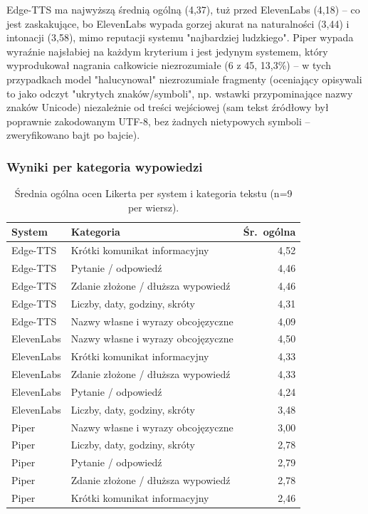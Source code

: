 \documentclass{article}
\begin{document}
Edge-TTS ma najwyższą średnią ogólną (4,37), tuż przed ElevenLabs (4,18) -- co jest
zaskakujące, bo ElevenLabs wypada gorzej akurat na naturalności (3,44) i intonacji (3,58),
mimo reputacji systemu "najbardziej ludzkiego". Piper wypada wyraźnie najsłabiej na każdym
kryterium i jest jedynym systemem, który wyprodukował nagrania całkowicie niezrozumiałe
(6 z 45, 13,3\%) -- w tych przypadkach model "halucynował" niezrozumiałe fragmenty (oceniający
opisywali to jako odczyt "ukrytych znaków/symboli", np. wstawki przypominające nazwy znaków
Unicode) niezależnie od treści wejściowej (sam tekst źródłowy był poprawnie zakodowanym
UTF-8, bez żadnych nietypowych symboli -- zweryfikowano bajt po bajcie).

\subsubsection{Wyniki per kategoria wypowiedzi}

\begin{table}[h]
\centering
\begin{tabular}{llr}
\toprule
System & Kategoria & Śr.~ogólna \\
\midrule
Edge-TTS   & Krótki komunikat informacyjny       & 4,52 \\
Edge-TTS   & Pytanie / odpowiedź                 & 4,46 \\
Edge-TTS   & Zdanie złożone / dłuższa wypowiedź   & 4,46 \\
Edge-TTS   & Liczby, daty, godziny, skróty        & 4,31 \\
Edge-TTS   & Nazwy własne i wyrazy obcojęzyczne   & 4,09 \\
\midrule
ElevenLabs & Nazwy własne i wyrazy obcojęzyczne   & 4,50 \\
ElevenLabs & Krótki komunikat informacyjny        & 4,33 \\
ElevenLabs & Zdanie złożone / dłuższa wypowiedź    & 4,33 \\
ElevenLabs & Pytanie / odpowiedź                  & 4,24 \\
ElevenLabs & Liczby, daty, godziny, skróty         & 3,48 \\
\midrule
Piper      & Nazwy własne i wyrazy obcojęzyczne   & 3,00 \\
Piper      & Liczby, daty, godziny, skróty        & 2,78 \\
Piper      & Pytanie / odpowiedź                  & 2,79 \\
Piper      & Zdanie złożone / dłuższa wypowiedź    & 2,78 \\
Piper      & Krótki komunikat informacyjny         & 2,46 \\
\bottomrule
\end{tabular}
\caption{Średnia ogólna ocen Likerta per system i kategoria tekstu (n=9 per wiersz).}
\end{table}
\end{document}
